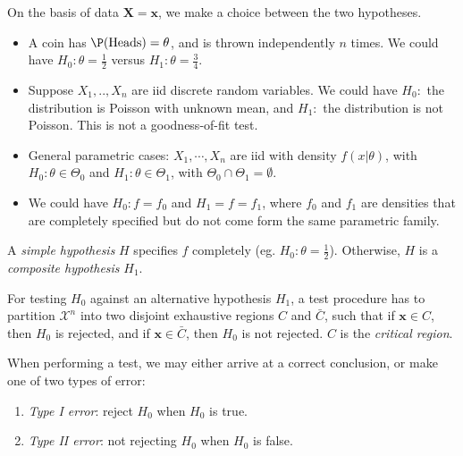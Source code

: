 \documentclass[a4paper]{article}
\begin{document}
On the basis of data $\mathbf{X} = \mathbf{x}$, we make a choice between the two hypotheses.

\begin{eg}\leavevmode
  \begin{itemize}
    \item A coin has $\P(\text{Heads}) = \theta$, and is thrown independently $n$ times. We could have $H_0:\theta = \frac{1}{2}$ versus $H_1: \theta = \frac{3}{4}.$
    \item Suppose $X_1, .., X_n$ are iid discrete random variables. We could have $H_0:$ the distribution is Poisson with unknown mean, and $H_1:$ the distribution is not Poisson. This is not a goodness-of-fit test.
    \item General parametric cases: $X_1, \cdots , X_n$ are iid with density $f(x|\theta)$, with $H_0: \theta\in \Theta_0$ and $H_1:\theta\in \Theta_1$, with $\Theta_0\cap \Theta_1 = \emptyset$.
    \item We could have $H_0: f = f_0$ and $H_1 = f = f_1$, where $f_0$ and $f_1$ are densities that are completely specified but do not come form the same parametric family.
  \end{itemize}
\end{eg}

\begin{defi}
  A \emph{simple hypothesis} $H$ specifies $f$ completely (eg. $H_0: \theta = \frac{1}{2}$). Otherwise, $H$ is a \emph{composite hypothesis} $H_1$.
\end{defi}

\begin{defi}
  For testing $H_0$ against an alternative hypothesis $H_1$, a test procedure has to partition $\mathcal{X}^n$ into two disjoint exhaustive regions $C$ and $\bar C$, such that if $\mathbf{x}\in C$, then $H_0$ is rejected, and if $\mathbf{x}\in \bar C$, then $H_0$ is not rejected. $C$ is the \emph{critical region}.
\end{defi}

When performing a test, we may either arrive at a correct conclusion, or make one of two types of error:
\begin{defi}\leavevmode
  \begin{enumerate}
    \item \emph{Type I error}: reject $H_0$ when $H_0$ is true.
    \item \emph{Type II error}: not rejecting $H_0$ when $H_0$ is false.
  \end{enumerate}
\end{defi}
\end{document}
